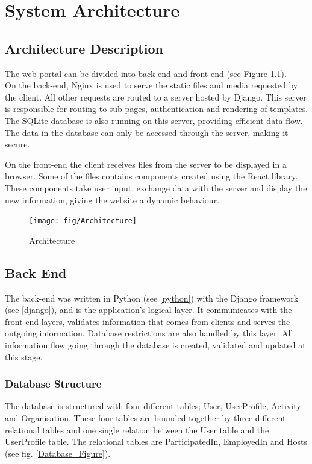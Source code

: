
\chapter{System Architecture}

\section{Architecture Description}
The web portal can be divided into back-end and front-end (see Figure \ref{Architecture}).
\\On the back-end, Nginx is used to serve the static files and media requested by the client. All other requests are routed to a server hosted by Django. This server is responsible for routing to sub-pages, authentication and rendering of templates. The SQLite database is also running on this server, providing efficient data flow. The data in the database can only be accessed through the server, making it secure.

On the front-end the client receives files from the server to be displayed in a browser. Some of the files contains components created using the React library. These components take user input, exchange data with the server and display the new information, giving the website a dynamic behaviour.

\begin{figure}[ht]
\centering
    \texttt{[image: fig/Architecture]}
\caption{Architecture}
\label{Architecture}
\end{figure}

\section{Back End}
The back-end was written in Python (see \ref{python}) with the Django framework (see \ref{django}), and is the application's logical layer. It communicates with the front-end layers, validates information that comes from clients and serves the outgoing information. Database restrictions are also handled by this layer. All information flow going through the database is created, validated and updated at this stage. 


\subsection{Database Structure}
The database is structured with four different tables; User, UserProfile, Activity and Organisation. These four tables are bounded together by three different relational tables and one single relation between the User table and the UserProfile table. The relational tables are ParticipatedIn, EmployedIn and Hosts (see fig. \ref{Database_Figure}).

